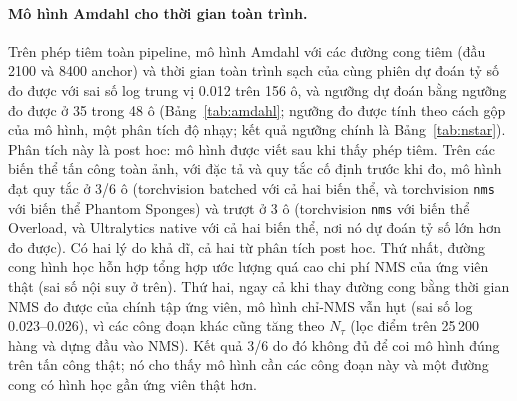 \documentclass[a4paper,fleqn]{cas-dc}
\newcommand{\Ntau}{N_{\tau}}
\begin{document}

\paragraph{Mô hình Amdahl cho thời gian toàn trình.}
Trên phép tiêm toàn pipeline, mô hình Amdahl với các đường cong tiêm (đầu 2100 và 8400 anchor) và thời gian toàn trình sạch của cùng phiên dự đoán tỷ số đo được với sai số log trung vị 0.012 trên 156 ô, và ngưỡng dự đoán bằng ngưỡng đo được ở 35 trong 48 ô (Bảng~\ref{tab:amdahl}; ngưỡng đo được tính theo cách gộp của mô hình, một phân tích độ nhạy; kết quả ngưỡng chính là Bảng~\ref{tab:nstar}). Phân tích này là post hoc: mô hình được viết sau khi thấy phép tiêm. Trên các biến thể tấn công toàn ảnh, với đặc tả và quy tắc cố định trước khi đo, mô hình đạt quy tắc ở 3/6 ô (torchvision batched với cả hai biến thể, và torchvision \texttt{nms} với biến thể Phantom Sponges) và trượt ở 3 ô (torchvision \texttt{nms} với biến thể Overload, và Ultralytics native với cả hai biến thể, nơi nó dự đoán tỷ số lớn hơn đo được). Có hai lý do khả dĩ, cả hai từ phân tích post hoc. Thứ nhất, đường cong hình học hỗn hợp tổng hợp ước lượng quá cao chi phí NMS của ứng viên thật (sai số nội suy ở trên). Thứ hai, ngay cả khi thay đường cong bằng thời gian NMS đo được của chính tập ứng viên, mô hình chỉ-NMS vẫn hụt (sai số log 0.023--0.026), vì các công đoạn khác cũng tăng theo $\Ntau$ (lọc điểm trên 25\,200 hàng và dựng đầu vào NMS). Kết quả 3/6 do đó không đủ để coi mô hình đúng trên tấn công thật; nó cho thấy mô hình cần các công đoạn này và một đường cong có hình học gần ứng viên thật hơn.
\end{document}
